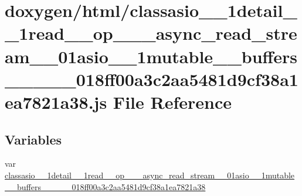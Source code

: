 \hypertarget{classasio__1__1detail__1__1read____op__3__01__async__read__stream__00__01asio__1__1mutable____buf9474ef329b7e31cfd7db46a0cd53986}{}\section{doxygen/html/classasio\+\_\+\_\+1detail\+\_\+\_\+1read\+\_\+\+\_\+op\+\_\+\_\+\_\+async\+\_\+read\+\_\+stream\+\_\+\_\+01asio\+\_\+\_\+1mutable\+\_\+\+\_\+buffers\+\_\+\+\_\+\_\+\_\+\_\+018ff00a3c2aa5481d9cf38a1ea7821a38.js File Reference}
\label{classasio__1__1detail__1__1read____op__3__01__async__read__stream__00__01asio__1__1mutable____buf9474ef329b7e31cfd7db46a0cd53986}
\subsection*{Variables}
\begin{DoxyCompactItemize}
\item 
var \hyperlink{classasio__1__1detail__1__1read____op__3__01__async__read__stream__00__01asio__1__1mutable____buf9474ef329b7e31cfd7db46a0cd53986_a2afd648cf049db9195027a1d0da2e130}{classasio\+\_\+\_\+1detail\+\_\+\_\+1read\+\_\+\+\_\+op\+\_\+\_\+\_\+async\+\_\+read\+\_\+stream\+\_\+\_\+01asio\+\_\+\_\+1mutable\+\_\+\+\_\+buffers\+\_\+\+\_\+\_\+\_\+\_\+018ff00a3c2aa5481d9cf38a1ea7821a38}
\end{DoxyCompactItemize}


